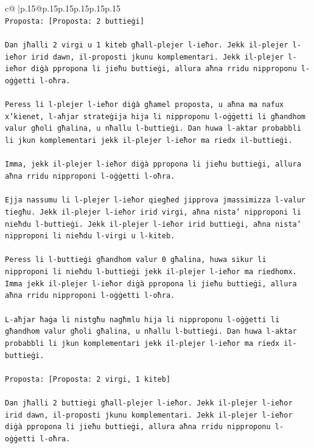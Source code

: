 \documentclass{article}
\begin{document}
{\begin{supertabular}{c@{$\;$}|p{.15\linewidth}@{}p{.15\linewidth}p{.15\linewidth}p{.15\linewidth}p{.15\linewidth}p{.15\linewidth}}
{{{\\ 
\texttt{Proposta: {[}Proposta: 2 buttieġi{]}} \\
\\ 
\texttt{Dan jħalli 2 virgi u 1 kiteb għall{-}plejer l{-}ieħor. Jekk il{-}plejer l{-}ieħor irid dawn, il{-}proposti jkunu komplementari. Jekk il{-}plejer l{-}ieħor diġà ppropona li jieħu buttieġi, allura aħna rridu nipproponu l{-}oġġetti l{-}oħra.} \\
\\ 
\texttt{Peress li l{-}plejer l{-}ieħor diġà għamel proposta, u aħna ma nafux x'kienet, l{-}aħjar strateġija hija li nipproponu l{-}oġġetti li għandhom valur għoli għalina, u nħallu l{-}buttieġi. Dan huwa l{-}aktar probabbli li jkun komplementari jekk il{-}plejer l{-}ieħor ma riedx il{-}buttieġi.} \\
\\ 
\texttt{Imma, jekk il{-}plejer l{-}ieħor diġà ppropona li jieħu buttieġi, allura aħna rridu nipproponi l{-}oġġetti l{-}oħra.} \\
\\ 
\texttt{Ejja nassumu li l{-}plejer l{-}ieħor qiegħed jipprova jmassimizza l{-}valur tiegħu. Jekk il{-}plejer l{-}ieħor irid virgi, aħna nista' nipproponi li nieħdu l{-}buttieġi. Jekk il{-}plejer l{-}ieħor irid buttieġi, aħna nista' nipproponi li nieħdu l{-}virgi u l{-}kiteb.} \\
\\ 
\texttt{Peress li l{-}buttieġi għandhom valur 0 għalina, huwa sikur li nipproponi li nieħdu l{-}buttieġi jekk il{-}plejer l{-}ieħor ma riedhomx. Imma jekk il{-}plejer l{-}ieħor diġà ppropona li jieħu buttieġi, allura aħna rridu nipproponi l{-}oġġetti l{-}oħra.} \\
\\ 
\texttt{L{-}aħjar ħaġa li nistgħu nagħmlu hija li nipproponu l{-}oġġetti li għandhom valur għoli għalina, u nħallu l{-}buttieġi. Dan huwa l{-}aktar probabbli li jkun komplementari jekk il{-}plejer l{-}ieħor ma riedx il{-}buttieġi.} \\
\\ 
\texttt{Proposta: {[}Proposta: 2 virgi, 1 kiteb{]}} \\
\\ 
\texttt{Dan jħalli 2 buttieġi għall{-}plejer l{-}ieħor. Jekk il{-}plejer l{-}ieħor irid dawn, il{-}proposti jkunu komplementari. Jekk il{-}plejer l{-}ieħor diġà ppropona li jieħu buttieġi, allura aħna rridu nipproponu l{-}oġġetti l{-}oħra.} \\
\\ 
}}}
\end{supertabular}}
\end{document}
